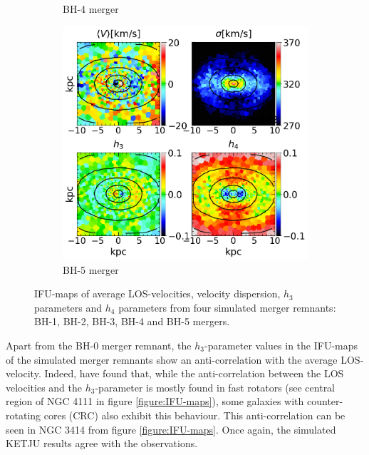 \documentclass[english, oneside]{HYgradu}
\begin{document}
\begin{figure}
\begin{subfigure}[b]{0.49\textwidth}
		\caption{BH-4 merger}
	\end{subfigure}
	\begin{subfigure}[b]{0.49\textwidth}
		\includegraphics[width=\textwidth]{BH_5.png}
		\caption{BH-5 merger}
	\end{subfigure}
	\caption{IFU-maps of average LOS-velocities, velocity dispersion, $h_3$ parameters and $h_4$ parameters from four simulated merger remnants: BH-1, BH-2, BH-3, BH-4 and BH-5 mergers.}
	\label{figure:rest_of_voronoi}
\end{figure}



Apart from the BH-0 merger remnant, the $h_3$-parameter values in the IFU-maps of the simulated merger remnants show an anti-correlation with the average LOS-velocity. Indeed, \cite{Krajnovic2011} have found that, while the anti-correlation between the LOS velocities and the $h_3$-parameter is mostly found in fast rotators (see central region of NGC 4111 in figure \ref{figure:IFU-maps}), some galaxies with counter-rotating cores (CRC) also exhibit this behaviour. This anti-correlation can be seen in NGC 3414 from figure \ref{figure:IFU-maps}. Once again, the simulated KETJU results agree with the observations.
\end{document}
